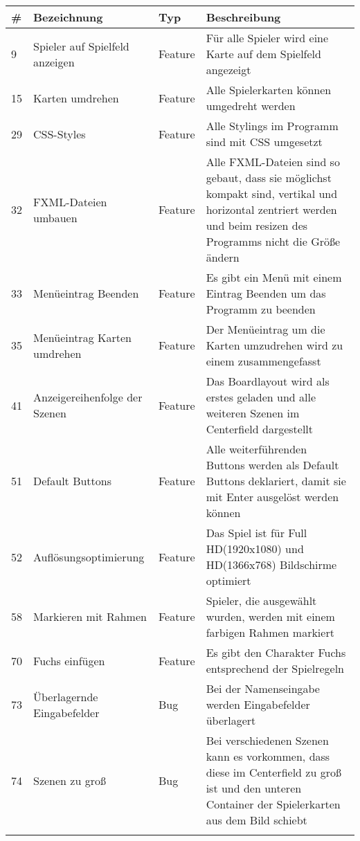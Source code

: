 \begin{tabularx}{\textwidth}{|l|p{4.5cm}|l|X|}
	\hline                                              %
	\textbf{\#}  		& \textbf{Bezeichnung}				& \textbf{Typ}	& \textbf{Beschreibung}\\ \hline \hline  
	\endhead    	
	9 \label{iss:9}		& Spieler auf Spielfeld anzeigen	& Feature		& Für alle Spieler wird eine Karte auf dem Spielfeld angezeigt\\ \hline
	15 \label{iss:15}	& Karten umdrehen					& Feature		& Alle Spielerkarten können umgedreht werden\\ \hline
	29 \label{iss:29}	& CSS-Styles						& Feature		& Alle Stylings im Programm sind mit CSS umgesetzt\\ \hline
	32 \label{iss:32}	& FXML-Dateien umbauen				& Feature		& Alle FXML-Dateien sind so gebaut, dass sie möglichst kompakt sind, vertikal und horizontal zentriert werden und beim resizen des Programms nicht die Größe ändern\\ \hline
	33 \label{iss:33}	& Menüeintrag Beenden				& Feature		& Es gibt ein Menü mit einem Eintrag Beenden um das Programm zu beenden\\ \hline
	35 \label{iss:35}	& Menüeintrag Karten umdrehen		& Feature		& Der Menüeintrag um die Karten umzudrehen wird zu einem zusammengefasst\\ \hline
	41 \label{iss:41}	& Anzeigereihenfolge der Szenen		& Feature		& Das Boardlayout wird als erstes geladen und alle weiteren Szenen im Centerfield dargestellt\\ \hline
	51 \label{iss:51}	& Default Buttons					& Feature		& Alle weiterführenden Buttons werden als Default Buttons deklariert, damit sie mit Enter ausgelöst werden können\\ \hline
	52 \label{iss:52}	& Auflösungsoptimierung				& Feature		& Das Spiel ist für Full HD(1920x1080) und HD(1366x768) Bildschirme optimiert\\ \hline
	58 \label{iss:58}	& Markieren mit Rahmen				& Feature		& Spieler, die ausgewählt wurden, werden mit einem farbigen Rahmen markiert\\ \hline
	70 \label{iss:70}	& Fuchs einfügen					& Feature		& Es gibt den Charakter Fuchs entsprechend der Spielregeln\\ \hline
	73 \label{iss:73}	& Überlagernde Eingabefelder		& Bug			& Bei der Namenseingabe werden Eingabefelder überlagert\\ \hline
	74 \label{iss:74}	& Szenen zu groß					& Bug			& Bei verschiedenen Szenen kann es vorkommen, dass diese im Centerfield zu groß ist und den unteren Container der Spielerkarten aus dem Bild schiebt\\ \hline
\caption{Tätigkeiten Matthias Hinrichs}\label{tbl:matthias}
\end{tabularx}

